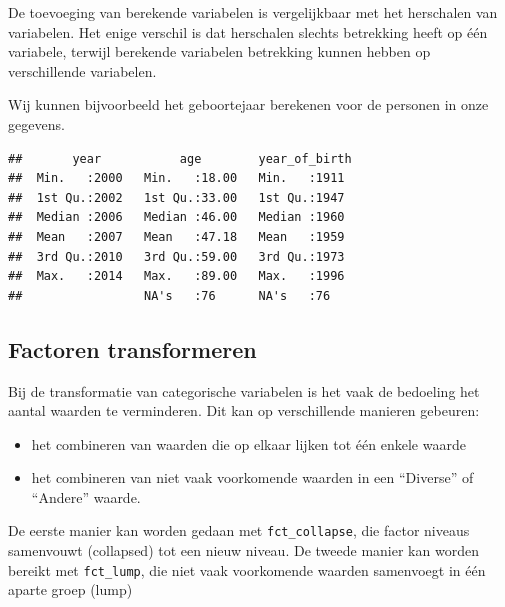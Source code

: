 \documentclass[]{tufte-book}
\newenvironment{Shaded}{}{}
\newcommand{\DataTypeTok}[1]{\textcolor[rgb]{0.56,0.13,0.00}{#1}}
\newcommand{\KeywordTok}[1]{\textcolor[rgb]{0.00,0.44,0.13}{\textbf{#1}}}
\newcommand{\NormalTok}[1]{#1}
\newcommand{\OperatorTok}[1]{\textcolor[rgb]{0.40,0.40,0.40}{#1}}
\newcommand{\StringTok}[1]{\textcolor[rgb]{0.25,0.44,0.63}{#1}}
\providecommand{\tightlist}{%
  \setlength{\itemsep}{0pt}\setlength{\parskip}{0pt}}
\begin{document}
De toevoeging van berekende variabelen is vergelijkbaar met het herschalen van variabelen. Het enige verschil is dat herschalen slechts betrekking heeft op één variabele, terwijl berekende variabelen betrekking kunnen hebben op verschillende variabelen.

Wij kunnen bijvoorbeeld het geboortejaar berekenen voor de personen in onze gegevens.

\begin{Shaded}
\end{Shaded}

\begin{verbatim}
##       year           age        year_of_birth 
##  Min.   :2000   Min.   :18.00   Min.   :1911  
##  1st Qu.:2002   1st Qu.:33.00   1st Qu.:1947  
##  Median :2006   Median :46.00   Median :1960  
##  Mean   :2007   Mean   :47.18   Mean   :1959  
##  3rd Qu.:2010   3rd Qu.:59.00   3rd Qu.:1973  
##  Max.   :2014   Max.   :89.00   Max.   :1996  
##                 NA's   :76      NA's   :76
\end{verbatim}

\hypertarget{factoren-transformeren}{%
\subsection{Factoren transformeren}\label{factoren-transformeren}}

Bij de transformatie van categorische variabelen is het vaak de bedoeling het aantal waarden te verminderen. Dit kan op verschillende manieren gebeuren:

\begin{itemize}
\tightlist
\item
  het combineren van waarden die op elkaar lijken tot één enkele waarde
\item
  het combineren van niet vaak voorkomende waarden in een ``Diverse'' of ``Andere'' waarde.
\end{itemize}

De eerste manier kan worden gedaan met \texttt{fct\_collapse}, die factor niveaus samenvouwt (collapsed) tot een nieuw niveau. De tweede manier kan worden bereikt met \texttt{fct\_lump}, die niet vaak voorkomende waarden samenvoegt in één aparte groep (lump)
\end{document}
